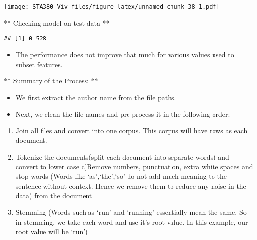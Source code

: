 \documentclass[
  12pt,
]{article}
\newenvironment{Shaded}{\begin{snugshade}}{\end{snugshade}}
\newcommand{\AttributeTok}[1]{\textcolor[rgb]{0.77,0.63,0.00}{#1}}
\newcommand{\CommentTok}[1]{\textcolor[rgb]{0.56,0.35,0.01}{\textit{#1}}}
\newcommand{\FunctionTok}[1]{\textcolor[rgb]{0.00,0.00,0.00}{#1}}
\newcommand{\NormalTok}[1]{#1}
\newcommand{\OtherTok}[1]{\textcolor[rgb]{0.56,0.35,0.01}{#1}}
\newcommand{\SpecialCharTok}[1]{\textcolor[rgb]{0.00,0.00,0.00}{#1}}
\newcommand{\StringTok}[1]{\textcolor[rgb]{0.31,0.60,0.02}{#1}}
\providecommand{\tightlist}{%
  \setlength{\itemsep}{0pt}\setlength{\parskip}{0pt}}
\begin{document}
\texttt{[image: STA380\_Viv\_files/figure-latex/unnamed-chunk-38-1.pdf]}

** Checking model on test data **

\begin{Shaded}
\end{Shaded}

\begin{verbatim}
## [1] 0.528
\end{verbatim}

\begin{itemize}
\tightlist
\item
  The performance does not improve that much for various values used to
  subset features.
\end{itemize}

** Summary of the Process: **

\begin{itemize}
\item
  We first extract the author name from the file paths.
\item
  Next, we clean the file names and pre-process it in the following
  order:
\end{itemize}

\begin{enumerate}
\def\labelenumi{\alph{enumi})}
\tightlist
\item
  Join all files and convert into one corpus. This corpus will have rows
  as each document.
\item
  Tokenize the documents(split each document into separate words) and
  convert to lower case c)Remove numbers, punctuation, extra white
  spaces and stop words (Words like `as',`the',`so' do not add much
  meaning to the sentence without context. Hence we remove them to
  reduce any noise in the data) from the document
\item
  Stemming (Words such as `run' and `running' essentially mean the same.
  So in stemming, we take each word and use it's root value. In this
  example, our root value will be `run')
\end{enumerate}
\end{document}
